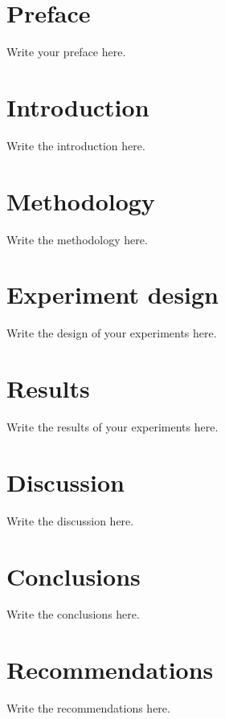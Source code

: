 \documentclass{stylesheets/BEMNextstyle}
\begin{document}
 {%
}{
 {%
	}{
		\newpage
	}
}
\pagestyle{trail}
\frontmatter
\cleardoublepage
{}
{}
\chapter*{Preface}
Write your preface here.

\tableofcontents
\mainmatter

\chapter{Introduction}
\label{sec:introduction}
Write the introduction here.

\chapter{Methodology}
\label{sec:introduction}
Write the methodology here.

\chapter{Experiment design}
\label{sec:experimentdesign}
Write the design of your experiments here.

\chapter{Results}
\label{sec:results}
Write the results of your experiments here.

\chapter{Discussion}
\label{sec:discussion}
Write the discussion here.

\chapter{Conclusions}
\label{sec:conclusions}
Write the conclusions here.

\chapter{Recommendations}
\label{sec::recommendations}
Write the recommendations here.
\end{document}
